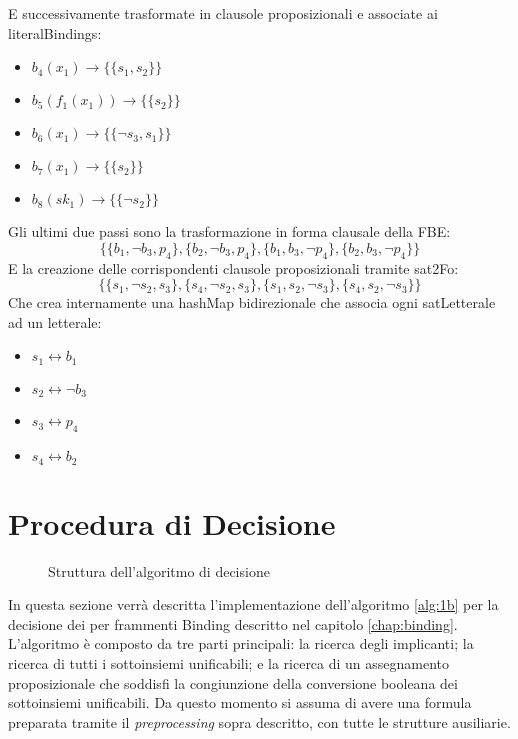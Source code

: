 \documentclass[./main.tex]{subfiles}
\begin{document}
E successivamente trasformate in clausole proposizionali e associate ai literalBindings:
\begin{itemize}
    \item $b_4(x_1) \rightarrow \{\{s_1, s_2\}\}$
    \item $b_5(f_1(x_1)) \rightarrow \{\{s_2\}\}$
    \item $b_6(x_1) \rightarrow \{\{\lnot s_3, s_1\}\}$
    \item $b_7(x_1) \rightarrow \{\{s_2\}\}$
    \item $b_8(sk_1) \rightarrow \{\{\lnot s_2\}\}$
\end{itemize}

Gli ultimi due passi sono la  trasformazione in forma clausale della FBE:
$$ \{\{b_1, \lnot b_3, p_4\}, \{b_2, \lnot b_3, p_4\}, \{b_1, b_3, \lnot p_4\}, \{b_2,  b_3, \lnot p_4\}\} $$
E la creazione delle corrispondenti clausole proposizionali tramite sat2Fo:
$$ \{\{s_1, \lnot s_2, s_3\}, \{s_4, \lnot s_2, s_3\}, \{s_1, s_2, \lnot s_3\}, \{s_4,  s_2, \lnot s_3\}\} $$
Che crea internamente una hashMap bidirezionale che associa ogni satLetterale ad un letterale:
\begin{multicols}{2}
\begin{itemize}
    \item $s_1 \leftrightarrow b_1$
    \item $s_2 \leftrightarrow \lnot b_3$
    \item $s_3 \leftrightarrow p_4$
    \item $s_4 \leftrightarrow b_2$
\end{itemize} 
\end{multicols}



\section{Procedura di Decisione} \label{sec:decisione}
\begin{figure}[H]
    \centering
    \scalebox{0.55}{
        
    }
    \caption{Struttura dell'algoritmo di decisione}
    \label{fig:algoritmo_decisione}
\end{figure}

In questa sezione verrà descritta l'implementazione dell'algoritmo \ref{alg:1b} per la decisione dei
per frammenti Binding descritto nel capitolo \ref{chap:binding}.
L'algoritmo è composto da tre parti principali: la ricerca degli implicanti;
la ricerca di tutti i sottoinsiemi unificabili; e la ricerca di un assegnamento proposizionale 
che soddisfi la congiunzione della conversione booleana dei sottoinsiemi unificabili.
Da questo momento si assuma di avere una formula preparata tramite
il \textit{preprocessing} sopra descritto, con tutte le strutture ausiliarie.
\end{document}
